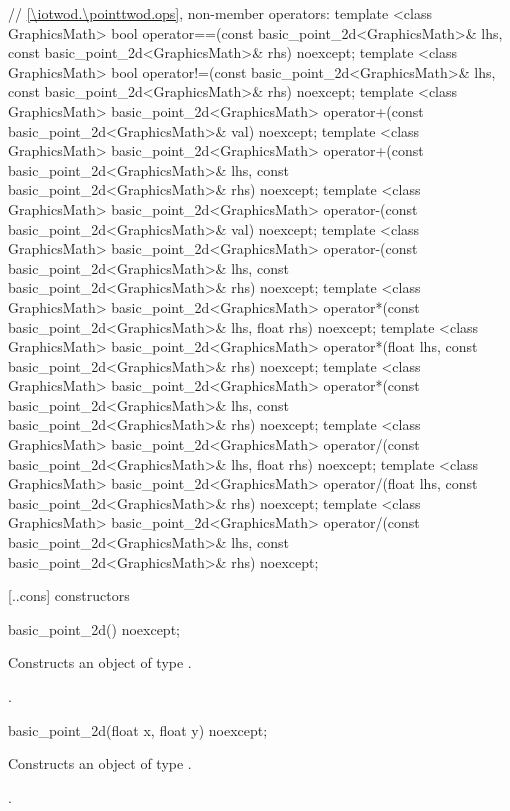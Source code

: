 \begin{codeblock}
{  // \ref{\iotwod.\pointtwod.ops}, non-member operators:
  template <class GraphicsMath>
  bool operator==(const basic_point_2d<GraphicsMath>& lhs,
    const basic_point_2d<GraphicsMath>& rhs) noexcept;
  template <class GraphicsMath>
  bool operator!=(const basic_point_2d<GraphicsMath>& lhs,
    const basic_point_2d<GraphicsMath>& rhs) noexcept;
  template <class GraphicsMath>
  basic_point_2d<GraphicsMath> operator+(const basic_point_2d<GraphicsMath>& val) noexcept;
  template <class GraphicsMath>
  basic_point_2d<GraphicsMath> operator+(const basic_point_2d<GraphicsMath>& lhs,
    const basic_point_2d<GraphicsMath>& rhs) noexcept;
  template <class GraphicsMath>
  basic_point_2d<GraphicsMath> operator-(const basic_point_2d<GraphicsMath>& val) noexcept;
  template <class GraphicsMath>
  basic_point_2d<GraphicsMath> operator-(const basic_point_2d<GraphicsMath>& lhs,
    const basic_point_2d<GraphicsMath>& rhs) noexcept;
  template <class GraphicsMath>
  basic_point_2d<GraphicsMath> operator*(const basic_point_2d<GraphicsMath>& lhs,
    float rhs) noexcept;
  template <class GraphicsMath>
  basic_point_2d<GraphicsMath> operator*(float lhs,
    const basic_point_2d<GraphicsMath>& rhs) noexcept;
  template <class GraphicsMath>
  basic_point_2d<GraphicsMath> operator*(const basic_point_2d<GraphicsMath>& lhs,
    const basic_point_2d<GraphicsMath>& rhs) noexcept;
  template <class GraphicsMath>
  basic_point_2d<GraphicsMath> operator/(const basic_point_2d<GraphicsMath>& lhs,
    float rhs) noexcept;
  template <class GraphicsMath>
  basic_point_2d<GraphicsMath> operator/(float lhs,
    const basic_point_2d<GraphicsMath>& rhs) noexcept;
  template <class GraphicsMath>
  basic_point_2d<GraphicsMath> operator/(const basic_point_2d<GraphicsMath>& lhs,
    const basic_point_2d<GraphicsMath>& rhs) noexcept;
}
\end{codeblock}

 [\iotwod.\pointtwod.cons] { constructors}

%
\begin{itemdecl}
basic_point_2d() noexcept;
\end{itemdecl}
\begin{itemdescr}
\pnum
\effects
Constructs an object of type .

\pnum
\postconditions
{}.
\end{itemdescr}

%
\begin{itemdecl}
basic_point_2d(float x, float y) noexcept;
\end{itemdecl}
\begin{itemdescr}
\pnum
\effects
Constructs an object of type .

\pnum
\postconditions
{}.
\end{itemdescr}

